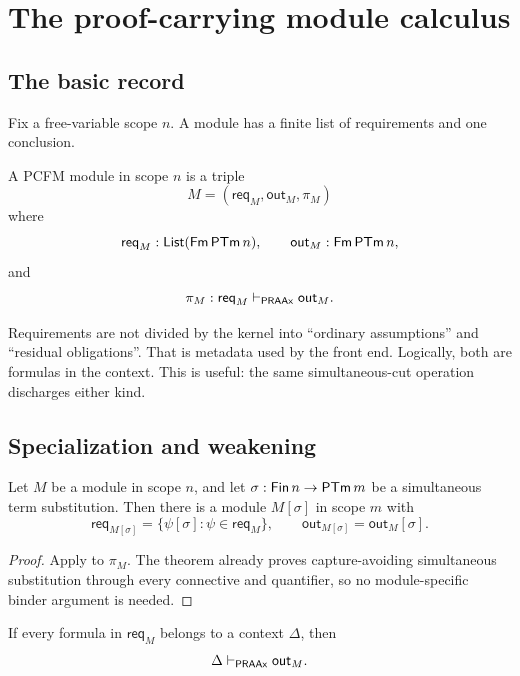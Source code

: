 
\section{The proof-carrying module calculus}
\label{sec:modules}

\subsection{The basic record}

Fix a free-variable scope \(n\).  A module has a finite list of requirements
and one conclusion.

\begin{definition}
A PCFM module in scope \(n\) is a triple
\[
   M=(\mathsf{req}_M,\mathsf{out}_M,\pi_M)
\]
where
\[
  \mathsf{req}_M:\mathsf{List}(\mathsf{Fm}\,\mathsf{PTm}\,n),\qquad
  \mathsf{out}_M:\mathsf{Fm}\,\mathsf{PTm}\,n,
\]
and
\[
  \pi_M:
  \mathsf{req}_M\vdash_{\mathsf{PRAAx}}\mathsf{out}_M.
\]
\end{definition}

Requirements are not divided by the kernel into ``ordinary assumptions'' and
``residual obligations''.  That is metadata used by the front end.  Logically,
both are formulas in the context.  This is useful: the same simultaneous-cut
operation discharges either kind.

\subsection{Specialization and weakening}

\begin{theorem}[Specialization]
Let \(M\) be a module in scope \(n\), and let
\(\sigma:\mathsf{Fin}\,n\to\mathsf{PTm}\,m\) be a simultaneous term substitution.
Then there is a module \(M[\sigma]\) in scope \(m\) with
\[
  \mathsf{req}_{M[\sigma]}
   = \{\psi[\sigma]:\psi\in\mathsf{req}_M\},
  \qquad
  \mathsf{out}_{M[\sigma]}=\mathsf{out}_M[\sigma].
\]
\end{theorem}

\begin{proof}
Apply  to \(\pi_M\).  The theorem already proves
capture-avoiding simultaneous substitution through every connective and
quantifier, so no module-specific binder argument is needed.
\end{proof}

\begin{theorem}[Weakening]
If every formula in \(\mathsf{req}_M\) belongs to a context \(\Delta\), then
\[
   \Delta\vdash_{\mathsf{PRAAx}}\mathsf{out}_M.
\]
\end{theorem}

